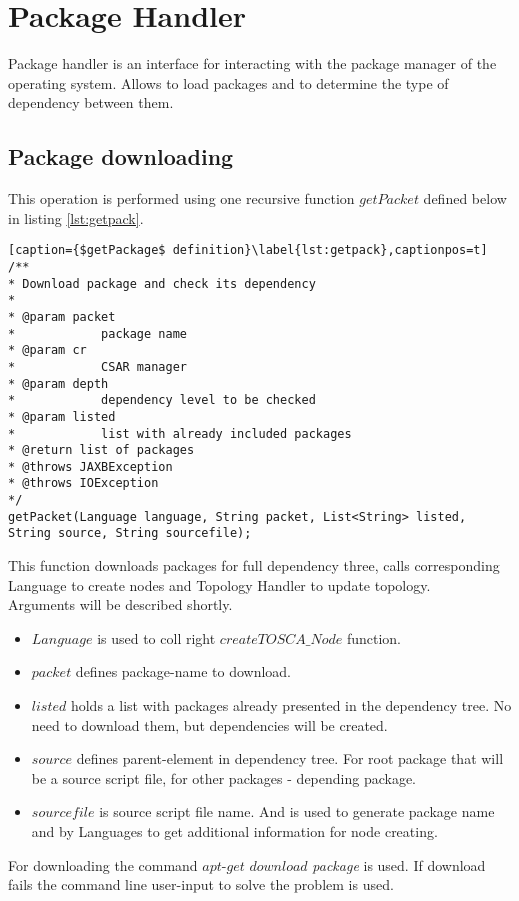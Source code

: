 \section{Package Handler}
Package handler is an interface for interacting with the package manager of the operating system.
Allows to load packages and to determine the type of dependency between them.

\subsection*{Package downloading}
This operation is performed using one recursive function $getPacket$ defined below in listing \ref{lst:getpack}.
\begin{lstlisting}[caption={$getPackage$ definition}\label{lst:getpack},captionpos=t]
/**
* Download package and check its dependency
* 
* @param packet
*            package name
* @param cr
*            CSAR manager
* @param depth
*            dependency level to be checked
* @param listed
*            list with already included packages
* @return list of packages
* @throws JAXBException
* @throws IOException
*/
getPacket(Language language, String packet, List<String> listed, String source, String sourcefile);
\end{lstlisting}
This function downloads packages for full dependency three, calls corresponding Language to create nodes and Topology Handler to update topology.\\
Arguments will be described shortly.
\begin{itemize}
	\item $Language$ is used to coll right $createTOSCA\_Node$ function.
	\item $packet$ defines package-name to download.
	\item $listed$ holds a list with packages already presented in the dependency tree. No need to download them, but dependencies will be created.
	\item $source$ defines parent-element in dependency tree. For root package that will be a source script file, for other packages - depending package.
	\item $sourcefile$ is source script file name. And is used to generate package name and by Languages to get additional information for node creating. 
\end{itemize}
For downloading the command $apt$-$get$ $download$ \emph{package} is used. 
If download fails the command line user-input to solve the problem is used. 

